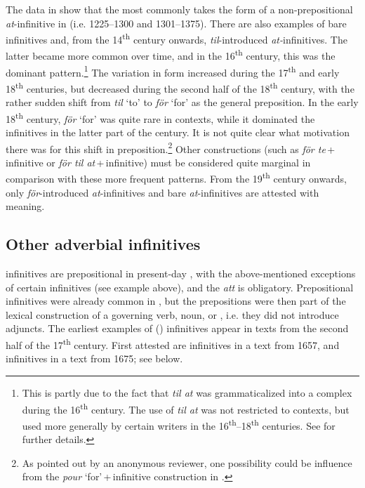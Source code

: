 \documentclass[output=paper]{langscibook}
\begin{document}
The data in  show that the  most commonly takes the form of a non-prepositional \textit{at}{}-infinitive in  (i.e. 1225–1300 and 1301–1375). There are also examples of bare infinitives and, from the 14\textsuperscript{th} century onwards, \textit{til}{}-introduced \textit{at-}infinitives. The latter became more common over time, and in the 16\textsuperscript{th} century, this was the dominant pattern.\footnote{This is partly due to the fact that \textit{til at} was grammaticalized into a complex  during the 16\textsuperscript{th} century. The use of \textit{til at} was not restricted to  contexts, but used more generally by certain writers in the 16\textsuperscript{th}–18\textsuperscript{th} centuries. See \textcites[]{Kalm2016Prepositioner}[203–221]{Kalm2016Satsekvivalenta} for further details.} The variation in form increased during the 17\textsuperscript{th} and early 18\textsuperscript{th} centuries, but decreased during the second half of the 18\textsuperscript{th} century, with the rather sudden shift from \textit{til} ‘to’ to \textit{för} ‘for’ as the general  preposition. In the early 18\textsuperscript{th} century, \textit{för} ‘for’ was quite rare in  contexts, while it dominated the  infinitives in the latter part of the century. It is not quite clear what motivation there was for this shift in  preposition.\footnote{As pointed out by an anonymous reviewer, one possibility could be influence from the  \textit{pour} ‘for’\,+\,infinitive construction in .}  Other constructions (such as \textit{för te}\,+\,infinitive or \textit{för til at}\,+\,infinitive) must be considered quite marginal in comparison with these more frequent patterns. From the 19\textsuperscript{th} century onwards, only \textit{för}{}-introduced \textit{at}{}-infinitives and bare \textit{at}{}-infinitives are attested with  meaning. 


\subsection{Other adverbial infinitives}\label{sec:kalm:4.2}

 infinitives are prepositional in present-day , with the above-mentioned exceptions of certain  infinitives (see example  above), and the  \textit{att} is obligatory. Prepositional infinitives were already common in , but the prepositions were then part of the lexical construction of a governing verb, noun, or , i.e. they did not introduce  adjuncts. The earliest examples of  () infinitives appear in texts from the second half of the 17\textsuperscript{th} century. First attested are  infinitives in a text from 1657, and  infinitives in a text from 1675; see  below. 
\end{document}

